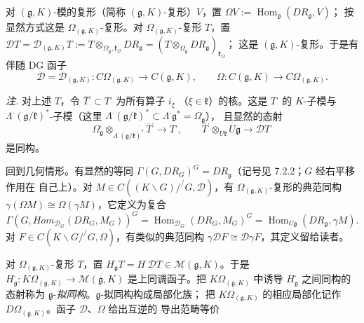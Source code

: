 对 $(\mathfrak{g},K)$-模的复形（简称 $(\mathfrak{g},K)$-复形）$V$，置
$\Omega V:=\operatorname{Hom}_{\mathfrak{g}}(DR_{\mathfrak{g}},V)$；
按显然方式这是 $\Omega_{(\mathfrak{g},K)}$-复形。对
$\Omega_{(\mathfrak{g},K)}$-复形 $T$，置
$\mathcal{D}T=\mathcal{D}_{(\mathfrak{g},K)}T:=
T\otimes_{\Omega_{\mathfrak{g}},\mathfrak{k}_\Omega}DR_{\mathfrak{g}}
=(T\otimes_{\Omega_{\mathfrak{g}}}DR_{\mathfrak{g}})_{\mathfrak{k}_\Omega}$；
这是 $(\mathfrak{g},K)$-复形。于是有伴随 DG 函子
\begin{equation}\tag{324}
\mathcal{D}=\mathcal{D}_{(\mathfrak{g},K)}:
C\Omega_{(\mathfrak{g},K)}\longrightarrow C(\mathfrak{g},K),\qquad
\Omega:C(\mathfrak{g},K)\longrightarrow C\Omega_{(\mathfrak{g},K)}.
\end{equation}

\emph{注.} 对上述 $T$，令
$\overline{T}^{\cdot}\subset T^{\cdot}$ 为所有算子 $i_\xi$
（$\xi\in\mathfrak{k}$）的核。这是 $T^{\cdot}$ 的 $K$-子模与
$\Lambda^{\cdot}(\mathfrak{g}/\mathfrak{k})^*$-子模（这里
$\Lambda^{\cdot}(\mathfrak{g}/\mathfrak{k})^*\subset
\Lambda^{\cdot}\mathfrak{g}^*=\Omega_{\mathfrak{g}}^{\cdot}$），
且显然的态射
\begin{equation}\tag{325}
\Omega_{\mathfrak{g}}^{\cdot}
\otimes_{\Lambda^{\cdot}(\mathfrak{g}/\mathfrak{k})^*}
\overline{T}^{\cdot}\longrightarrow T^{\cdot},\qquad
\overline{T}^{\cdot}\otimes_{U\mathfrak{k}}U\mathfrak{g}
\longrightarrow\mathcal{D}T^{\cdot}
\end{equation}
是同构。

 回到几何情形。有显然的等同
$\Gamma(G,DR_G)^G=DR_{\mathfrak{g}}$（记号见 7.2.2；$G$ 经右平移作用在
自己上）。对 $M\in C((K\backslash G)/^{/}G,\mathcal{D})$，有
$\Omega_{(\mathfrak{g},K)}$-复形的典范同构
$\gamma(\Omega M)\cong\Omega(\gamma M)$，它定义为复合
\[
\Gamma(G,\mathit{Hom}_{\mathcal{D}_G}(DR_G,M_G))^G
=\operatorname{Hom}_{\mathcal{D}_G}(DR_G,M_G)^G
=\operatorname{Hom}_{U\mathfrak{g}}(DR_{\mathfrak{g}},\gamma M).
\]
对 $F\in C(K\backslash G/^{/}G,\Omega)$，有类似的典范同构
$\gamma\mathcal{D}F\cong\mathcal{D}\gamma F$，其定义留给读者。

 对 $\Omega_{(\mathfrak{g},K)}$-复形 $T$，置
$H_{\mathfrak{g}}^{\cdot}T=H^{\cdot}\mathcal{D}T
\in\mathcal{M}(\mathfrak{g},K)$。于是
$H_{\mathfrak{g}}^{\cdot}:K\Omega_{(\mathfrak{g},K)}\to
\mathcal{M}(\mathfrak{g},K)$ 是上同调函子。把
$K\Omega_{(\mathfrak{g},K)}$ 中诱导 $H_{\mathfrak{g}}^{\cdot}$ 之间同构的
态射称为 $\mathfrak{g}$-\emph{拟同构}。$\mathfrak{g}$-拟同构构成局部化族；
把 $K\Omega_{(\mathfrak{g},K)}$ 的相应局部化记作
$D\Omega_{(\mathfrak{g},K)}$。函子 $\mathcal{D}$、$\Omega$ 给出互逆的
导出范畴等价

